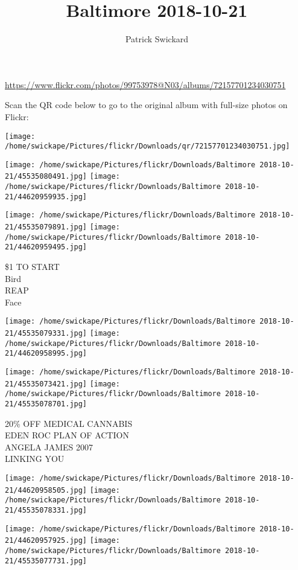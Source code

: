 \documentclass[10pt,letterpaper]{article}
\title{Baltimore 2018-10-21}
\author{Patrick Swickard}
\date{}
\begin{document}
\maketitle

\url{https://www.flickr.com/photos/99753978@N03/albums/72157701234030751}

Scan the QR code below to go to the original album with full-size photos on Flickr:

\texttt{[image: /home/swickape/Pictures/flickr/Downloads/qr/72157701234030751.jpg]}
\pagebreak

\texttt{[image: /home/swickape/Pictures/flickr/Downloads/Baltimore 2018-10-21/45535080491.jpg]}
\texttt{[image: /home/swickape/Pictures/flickr/Downloads/Baltimore 2018-10-21/44620959935.jpg]}

\texttt{[image: /home/swickape/Pictures/flickr/Downloads/Baltimore 2018-10-21/45535079891.jpg]}
\texttt{[image: /home/swickape/Pictures/flickr/Downloads/Baltimore 2018-10-21/44620959495.jpg]}

\$1 TO START\\
Bird\\
REAP\\
Face
\pagebreak

\texttt{[image: /home/swickape/Pictures/flickr/Downloads/Baltimore 2018-10-21/45535079331.jpg]}
\texttt{[image: /home/swickape/Pictures/flickr/Downloads/Baltimore 2018-10-21/44620958995.jpg]}

\texttt{[image: /home/swickape/Pictures/flickr/Downloads/Baltimore 2018-10-21/45535073421.jpg]}
\texttt{[image: /home/swickape/Pictures/flickr/Downloads/Baltimore 2018-10-21/45535078701.jpg]}

20\% OFF MEDICAL CANNABIS\\
EDEN ROC PLAN OF ACTION\\
ANGELA JAMES 2007\\
LINKING YOU
\pagebreak

\texttt{[image: /home/swickape/Pictures/flickr/Downloads/Baltimore 2018-10-21/44620958505.jpg]}
\texttt{[image: /home/swickape/Pictures/flickr/Downloads/Baltimore 2018-10-21/45535078331.jpg]}

\texttt{[image: /home/swickape/Pictures/flickr/Downloads/Baltimore 2018-10-21/44620957925.jpg]}
\texttt{[image: /home/swickape/Pictures/flickr/Downloads/Baltimore 2018-10-21/45535077731.jpg]}
\end{document}

